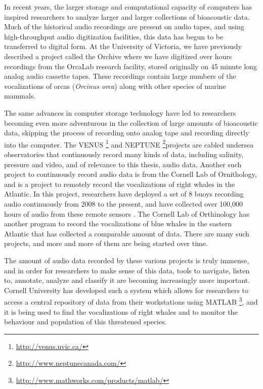 In recent years, the larger storage and computational capacity of
computers has inspired researchers to analyze larger and larger
collections of bioacoustic data.  Much of the historical audio
recordings are present on audio tapes, and using high-throughput audio
digitization facilities, this data has begun to be transferred to
digital form.  At the University of Victoria, we have previously
described a project called the Orchive \cite{ness2013orchive} where we
have digitized over \aboutNumberOfOrchiveRecordings hours recordings
from the OrcaLab research facility, stored originally on 45 minute
long analog audio cassette tapes.  These recordings contain large
numbers of the vocalizations of orcas (\textit{Orcinus orca}) along
with other species of marine mammals.

The same advances in computer storage technology have led to
researchers becoming even more adventurous in the collection of large
amounts of bioacoustic data, skipping the process of recording onto
analog tape and recording directly into the computer. The
VENUS \footnote{\url{http://venus.uvic.ca/}} and
NEPTUNE \footnote{\url{http://www.neptunecanada.com/}}projects are
cabled undersea observatories that continuously record many kinds of
data, including salinity, pressure and video, and of relevance to this
thesis, audio data.  Another such project to continuously record audio
data is from the Cornell Lab of Ornithology, and is a project to
remotely record the vocalizations of right whales in the Atlantic.  In
this project, researchers have deployed a set of 8 buoys recording
audio continuously from 2008 to the present, and have collected over
100,000 hours of audio from these remote sensors
\cite{urazghildiiev2009rightwhale}.  The Cornell Lab of Orthinology
has another program to record the vocalizations of blue whales in
the eastern Atlantic that has collected a comparable amount of data.
There are many such projects, and more and more of them are being
started over time.

The amount of audio data recorded by these various projects is truly
immense, and in order for researchers to make sense of this data,
tools to navigate, listen to, annotate, analyze and classify it are
becoming increasingly more important.  Cornell University has
developed such a system which allows for researchers to access a
central repository of data from their workstations using
MATLAB \footnote{\url{http://www.mathworks.com/products/matlab/}}, and
it is being used to find the vocalizations of right whales and to
monitor the behaviour and population of this threatened species.

